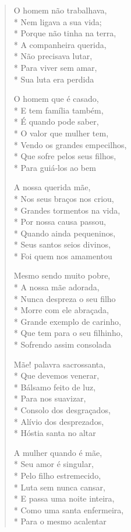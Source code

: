 \begin{verse}
O homem não trabalhava,\\*
Nem ligava a sua vida;\\*
Porque não tinha na terra,\\*
A companheira querida,\\*
Não precisava lutar,\\*
Para viver sem amar,\\*
Sua luta era perdida

O homem que é casado,\\*
E tem família também,\\*
É quando pode saber,\\*
O valor que mulher tem,\\*
Vendo os grandes empecilhos,\\*
Que sofre pelos seus filhos,\\*
Para guiá-los ao bem

A nossa querida mãe,\\*
Nos seus braços nos criou,\\*
Grandes tormentos na vida,\\*
Por nossa causa passou,\\*
Quando ainda pequeninos,\\*
Seus santos seios divinos,\\*
Foi quem nos amamentou

Mesmo sendo muito pobre,\\*
A nossa mãe adorada,\\*
Nunca despreza o seu filho\\*
Morre com ele abraçada,\\*
Grande exemplo de carinho,\\*
Que tem para o seu filhinho,\\*
Sofrendo assim consolada

Mãe! palavra sacrossanta,\\*
Que devemos venerar,\\*
Bálsamo feito de luz,\\*
Para nos suavizar,\\*
Consolo dos desgraçados,\\*
Alívio dos desprezados,\\*
Hóstia santa no altar

A mulher quando é mãe,\\*
Seu amor é singular,\\*
Pelo filho estremecido,\\*
Luta sem nunca cansar,\\*
E passa uma noite inteira,\\*
Como uma santa enfermeira,\\*
Para o mesmo acalentar


\end{verse}
